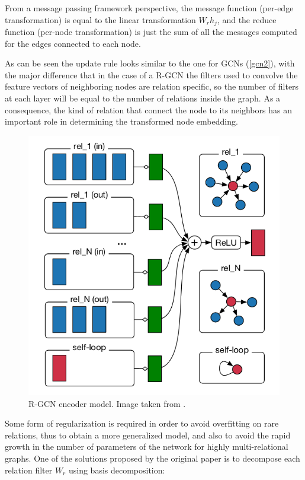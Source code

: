 \documentclass[%
    corpo=13.5pt,
    twoside,
    oldstyle,
    tipotesi=magistrale,
    greek,
    evenboxes
]{toptesi}
\begin{document}
From a message passing framework perspective, the message function (per-edge
transformation) is equal to the linear transformation $W_rh_j$, and the reduce
function (per-node transformation) is just the sum of
all the messages computed for the edges connected to each node.

As can be seen the update rule looks similar to the one for GCNs (\ref{gcn2}),
with the major difference that in the case of a R-GCN the filters used to
convolve the feature vectors of neighboring nodes are relation specific, so the
number of filters at each layer will be equal to the number of relations inside
the graph. As a consequence, the kind of relation that connect the node
to its neighbors has an important role in determining the transformed node
embedding.

\begin{figure}[h]
    \centering
    \includegraphics[scale=0.48]{img/rgcn-encoder.png}
    \caption{R-GCN encoder model. Image taken from \cite{schlichtkrull2018}.}
    \label{fig:rgcn-encoder}
\end{figure}

Some form of regularization is required in order to avoid overfitting on rare
relations, thus to obtain a more generalized model, and also to avoid
the rapid growth in the number of parameters of the network for
highly multi-relational graphs. One of the solutions proposed by the original
paper \cite{schlichtkrull2018} is to decompose each relation filter $W_r$
using basis decomposition:
\end{document}
